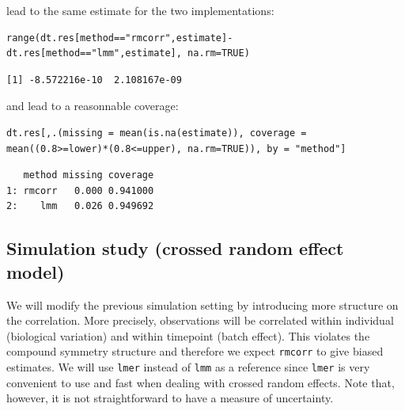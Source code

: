 \documentclass[12pt]{article}
\begin{document}
lead to the same estimate for the two implementations:
\lstset{language=r,label= ,caption= ,captionpos=b,numbers=none}
\begin{lstlisting}
range(dt.res[method=="rmcorr",estimate]-dt.res[method=="lmm",estimate], na.rm=TRUE)
\end{lstlisting}

\begin{verbatim}
[1] -8.572216e-10  2.108167e-09
\end{verbatim}


and lead to a reasonnable coverage:
\lstset{language=r,label= ,caption= ,captionpos=b,numbers=none}
\begin{lstlisting}
dt.res[,.(missing = mean(is.na(estimate)), coverage = mean((0.8>=lower)*(0.8<=upper), na.rm=TRUE)), by = "method"]
\end{lstlisting}

\begin{verbatim}
   method missing coverage
1: rmcorr   0.000 0.941000
2:    lmm   0.026 0.949692
\end{verbatim}

\subsection{Simulation study (crossed random effect model)}
\label{sec:org9bb6802}

We will modify the previous simulation setting by introducing more
structure on the correlation. More precisely, observations will be
correlated within individual (biological variation) and within
timepoint (batch effect). This violates the compound symmetry
structure and therefore we expect \texttt{rmcorr} to give biased
estimates. We will use \texttt{lmer} instead of \texttt{lmm} as a reference since
\texttt{lmer} is very convenient to use and fast when dealing with crossed
random effects. Note that, however, it is not straightforward to have a
measure of uncertainty.
\end{document}
